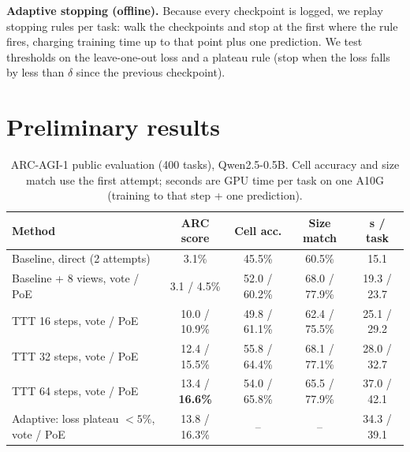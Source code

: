 \documentclass{article}
\begin{document}
\textbf{Adaptive stopping (offline).} Because every checkpoint is logged, we replay stopping rules per task: walk the checkpoints and stop at the first where the rule fires, charging training time up to that point plus one prediction. We test thresholds on the leave-one-out loss and a plateau rule (stop when the loss falls by less than $\delta$ since the previous checkpoint).

\section{Preliminary results}

\begin{table}[h]
\centering
\caption{ARC-AGI-1 public evaluation (400 tasks), Qwen2.5-0.5B. Cell accuracy and size match use the first attempt; seconds are GPU time per task on one A10G (training to that step + one prediction).}
\label{tab:main}
\small
\begin{tabular}{lcccc}
\toprule
Method & ARC score & Cell acc. & Size match & s / task \\
\midrule
Baseline, direct (2 attempts) & 3.1\% & 45.5\% & 60.5\% & 15.1 \\
Baseline + 8 views, vote / PoE & 3.1 / 4.5\% & 52.0 / 60.2\% & 68.0 / 77.9\% & 19.3 / 23.7 \\
TTT 16 steps, vote / PoE & 10.0 / 10.9\% & 49.8 / 61.1\% & 62.4 / 75.5\% & 25.1 / 29.2 \\
TTT 32 steps, vote / PoE & 12.4 / 15.5\% & 55.8 / 64.4\% & 68.1 / 77.1\% & 28.0 / 32.7 \\
TTT 64 steps, vote / PoE & 13.4 / \textbf{16.6\%} & 54.0 / 65.8\% & 65.5 / 77.9\% & 37.0 / 42.1 \\
Adaptive: loss plateau $<5\%$, vote / PoE & 13.8 / 16.3\% & -- & -- & 34.3 / 39.1 \\
\bottomrule
\end{tabular}
\end{table}
\end{document}
